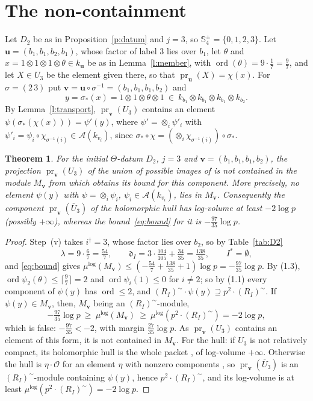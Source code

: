 \documentclass[11pt]{amsart}
\newtheorem{theorem}{Theorem}
\theoremstyle{remark}
\newcommand{\cO}{\mathcal O}
\newcommand{\cA}{\mathcal A}
\newcommand{\dd}{\mathfrak d}
\newcommand{\mulog}{\mu^{\log}}
\newcommand{\RIt}{(R_I)^{\sim}}
\newcommand{\pr}{\operatorname{pr}}
\newcommand{\bv}{\mathbf v}
\newcommand{\bu}{\mathbf u}
\begin{document}
\section{The non-containment}\label{s:main}

Let $D_2$ be as in Proposition~\ref{p:datum} and $j=3$, so $\mathbb S^\pm_4=\{0,1,2,3\}$. Let
$\bu=(b_1,b_1,b_2,b_1)$, whose factor of label $3$ lies over $b_1$, let $\theta$ and $x=1\otimes1\otimes1\otimes\theta
\in k_{\bu}$ be as in Lemma~\ref{l:member}, with $\operatorname{ord}(\theta)=9\cdot\tfrac17=\tfrac97$, and let $X\in U_3$
be the element given there, so that $\pr_{\bu}(X)=\chi(x)$. For $\sigma=(2\,3)$ put $\bv=\bu\circ\sigma^{-1}
=(b_1,b_1,b_1,b_2)$ and
\[
y=\sigma_*(x)=1\otimes1\otimes\theta\otimes1\ \in\ k_{b_1}\otimes k_{b_1}\otimes k_{b_1}\otimes k_{b_2}.
\]
By Lemma~\ref{l:transport}, $\pr_{\bv}(U_3)$ contains an element $\psi(\sigma_*(\chi(x)))=\psi'(y)$, where
$\psi'=\otimes_i\psi'_i$ with $\psi'_i=\psi_i\circ\chi_{\sigma^{-1}(i)}\in\cA(k_{v_i})$, since
$\sigma_*\circ\chi=(\otimes_i\chi_{\sigma^{-1}(i)})\circ\sigma_*$.

\begin{theorem}\label{t:main}
For the initial $\Theta$-datum $D_2$, $j=3$ and $\bv=(b_1,b_1,b_1,b_2)$, the projection $\pr_{\bv}(U_3)$ of the
union of possible images of \cite[Cor.~3.12]{IUT3} is not contained in the module $M_{\bv}$ from which
\cite[Thm.~1.10, Step~(v)]{IUT4} obtains its bound for this component. More precisely, no element $\psi(y)$ with
$\psi=\otimes_i\psi_i$, $\psi_i\in\cA(k_{v_i})$, lies in $M_{\bv}$. Consequently the component
$\pr_{\bv}(\overline U_3)$ of the holomorphic hull has log-volume at least $-2\log p$ (possibly $+\infty$), whereas
the bound~\eqref{eq:bound} for it is $-\tfrac{97}{35}\log p$.
\end{theorem}

\begin{proof}
Step~(v) takes $i^\dagger=3$, whose factor lies over $b_2$, so by Table~\ref{tab:D2}
\[
\lambda=9\cdot\tfrac67=\tfrac{54}7,\qquad \dd_I=3\cdot\tfrac{104}{105}+\tfrac{34}{35}=\tfrac{138}{35},\qquad
I^*=\emptyset,
\]
and \eqref{eq:bound} gives $\mulog(M_{\bv})\le(-\tfrac{54}7+\tfrac{138}{35}+1)\log p=-\tfrac{97}{35}\log p$. By (1.3),
$\operatorname{ord}\psi_2(\theta)\le\lceil\tfrac97\rceil=2$ and $\operatorname{ord}\psi_i(1)\le0$ for $i\ne2$; so by
(1.1) every component of $\psi(y)$ has $\operatorname{ord}\le2$, and $\RIt\cdot\psi(y)\supseteq p^2\cdot\RIt$. If
$\psi(y)\in M_{\bv}$, then, $M_{\bv}$ being an $\RIt$-module,
\[
-\tfrac{97}{35}\log p\ \ge\ \mulog(M_{\bv})\ \ge\ \mulog(p^2\cdot\RIt)=-2\log p,
\]
which is false: $-\tfrac{97}{35}<-2$, with margin $\tfrac{27}{35}\log p$. As $\pr_{\bv}(U_3)$ contains an element of
this form, it is not contained in $M_{\bv}$. For the hull: if $U_3$ is not relatively compact, its holomorphic hull
is the whole packet \cite[Rem.~3.9.5(i)]{IUT3}, of log-volume $+\infty$. Otherwise the hull is $\eta\cdot\cO$ for an
element $\eta$ with nonzero components \cite[ibid.]{IUT3}, so $\pr_{\bv}(\overline U_3)$ is an $\RIt$-module
containing $\psi(y)$, hence $p^2\cdot\RIt$, and its log-volume is at least $\mulog(p^2\cdot\RIt)=-2\log p$.
\end{proof}
\end{document}
